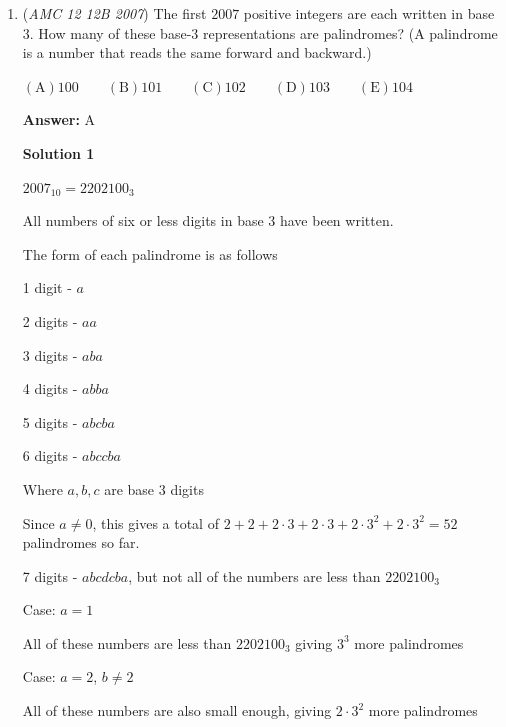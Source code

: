 \begin{enumerate}
 
$\frac{b-a}{2} = k^2$

 
where $k$ is some positive integer.

 Rearranging, we get

 
$b = a + 2k^2$

 Now we can rewrite the sum as

 
$a + a + 2k^2 +12k$.

 
Since both $a$ and $k$ must be at least $1$, the minimum value is

 
$1 + 1 + 2(1)^2 + 12(1) = 16 \Rightarrow \boxed{\text{D}}$.

 


	\item (\textit{AMC 12 12B 2007}) The first $2007$ positive integers are each written in base $3$. How many of these base-$3$ representations are palindromes? (A palindrome is a number that reads the same forward and backward.)


 $\mathrm {(A)} 100\qquad \mathrm {(B)} 101\qquad \mathrm {(C)} 102\qquad \mathrm {(D)} 103\qquad \mathrm {(E)} 104$

 \textbf{Answer: }A



\textbf{Solution 1}

$2007_{10} = 2202100_{3}$

 All numbers of six or less digits in base 3 have been written.

 The form of each palindrome is as follows

 1 digit  - $a$

 2 digits - $aa$

 3 digits - $aba$

 4 digits - $abba$

 5 digits - $abcba$

 6 digits - $abccba$

 Where $a,b,c$ are base 3 digits

 Since $a \neq 0$, this gives a total of $2 + 2 + 2\cdot 3 + 2\cdot 3 + 2\cdot 3^2 + 2\cdot 3^2 = 52$ palindromes so far.

 7 digits - $abcdcba$, but not all of the numbers are less than $2202100_{3}$

 Case: $a=1$

 All of these numbers are less than $2202100_3$ giving $3^3$ more palindromes

 Case: $a=2$, $b\neq 2$

 All of these numbers are also small enough, giving $2\cdot 3^2$ more palindromes


\end{enumerate}
